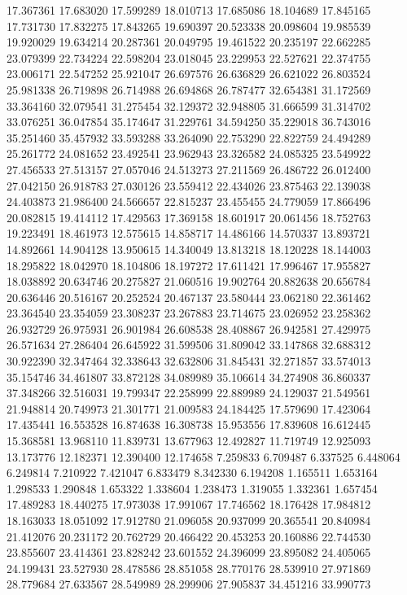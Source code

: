 17.367361
17.683020
17.599289
18.010713
17.685086
18.104689
17.845165
17.731730
17.832275
17.843265
19.690397
20.523338
20.098604
19.985539
19.920029
19.634214
20.287361
20.049795
19.461522
20.235197
22.662285
23.079399
22.734224
22.598204
23.018045
23.229953
22.527621
22.374755
23.006171
22.547252
25.921047
26.697576
26.636829
26.621022
26.803524
25.981338
26.719898
26.714988
26.694868
26.787477
32.654381
31.172569
33.364160
32.079541
31.275454
32.129372
32.948805
31.666599
31.314702
33.076251
36.047854
35.174647
31.229761
34.594250
35.229018
36.743016
35.251460
35.457932
33.593288
33.264090
22.753290
22.822759
24.494289
25.261772
24.081652
23.492541
23.962943
23.326582
24.085325
23.549922
27.456533
27.513157
27.057046
24.513273
27.211569
26.486722
26.012400
27.042150
26.918783
27.030126
23.559412
22.434026
23.875463
22.139038
24.403873
21.986400
24.566657
22.815237
23.455455
24.779059
17.866496
20.082815
19.414112
17.429563
17.369158
18.601917
20.061456
18.752763
19.223491
18.461973
12.575615
14.858717
14.486166
14.570337
13.893721
14.892661
14.904128
13.950615
14.340049
13.813218
18.120228
18.144003
18.295822
18.042970
18.104806
18.197272
17.611421
17.996467
17.955827
18.038892
20.634746
20.275827
21.060516
19.902764
20.882638
20.656784
20.636446
20.516167
20.252524
20.467137
23.580444
23.062180
22.361462
23.364540
23.354059
23.308237
23.267883
23.714675
23.026952
23.258362
26.932729
26.975931
26.901984
26.608538
28.408867
26.942581
27.429975
26.571634
27.286404
26.645922
31.599506
31.809042
33.147868
32.688312
30.922390
32.347464
32.338643
32.632806
31.845431
32.271857
33.574013
35.154746
34.461807
33.872128
34.089989
35.106614
34.274908
36.860337
37.348266
32.516031
19.799347
22.258999
22.889989
24.129037
21.549561
21.948814
20.749973
21.301771
21.009583
24.184425
17.579690
17.423064
17.435441
16.553528
16.874638
16.308738
15.953556
17.839608
16.612445
15.368581
13.968110
11.839731
13.677963
12.492827
11.719749
12.925093
13.173776
12.182371
12.390400
12.174658
7.259833
6.709487
6.337525
6.448064
6.249814
7.210922
7.421047
6.833479
8.342330
6.194208
1.165511
1.653164
1.298533
1.290848
1.653322
1.338604
1.238473
1.319055
1.332361
1.657454
17.489283
18.440275
17.973038
17.991067
17.746562
18.176428
17.984812
18.163033
18.051092
17.912780
21.096058
20.937099
20.365541
20.840984
21.412076
20.231172
20.762729
20.466422
20.453253
20.160886
22.744530
23.855607
23.414361
23.828242
23.601552
24.396099
23.895082
24.405065
24.199431
23.527930
28.478586
28.851058
28.770176
28.539910
27.971869
28.779684
27.633567
28.549989
28.299906
27.905837
34.451216
33.990773
